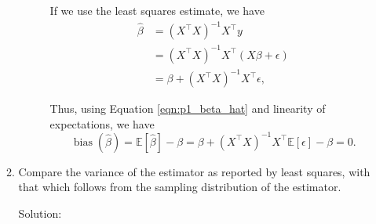 \documentclass[letterpaper,11pt]{article}
\begin{document}
\begin{enumerate}
\begin{enumerate}
\begin{description}
      If we use the least squares estimate, we have
      \begin{align}
        \hat{\beta}
        &= \left(X^\intercal X\right)^{-1}X^\intercal y \nonumber\\
        &= \left(X^\intercal X\right)^{-1}X^\intercal\left(X\beta + \epsilon \right) \nonumber\\
        &= \beta + \left(X^\intercal X\right)^{-1}X^\intercal\epsilon,
          \label{eqn:p1_beta_hat}
      \end{align}

      Thus, using Equation \ref{eqn:p1_beta_hat} and linearity of expectations,
      we have
      \begin{equation}
        \boxed{
          \operatorname{bias}\left(\hat{\beta}\right) =
          \mathbb{E}\left[\hat{\beta}\right] - \beta =
          \beta +
          \left(X^\intercal X\right)^{-1}X^\intercal
          \mathbb{E}\left[\epsilon\right] - \beta
          = 0.
        }
        \label{eqn:p1_beta_hat_bias}
      \end{equation}
    \end{description}
  \item Compare the variance of the estimator as reported by least squares, with
    that which follows from the sampling distribution of the estimator.

    \begin{description}
    \item[Solution:] 
    \end{description}
  \end{enumerate}
\end{enumerate}
\end{document}
